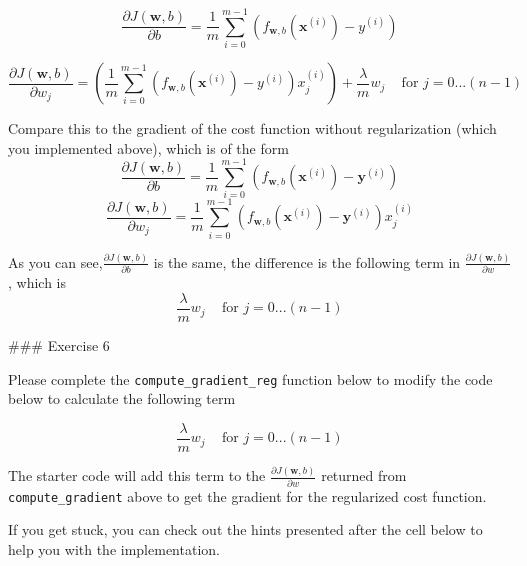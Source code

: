 \documentclass[11pt]{article}
\begin{document}
\[\frac{\partial J(\mathbf{w},b)}{\partial b} = \frac{1}{m}  \sum_{i=0}^{m-1} (f_{\mathbf{w},b}(\mathbf{x}^{(i)}) - y^{(i)})  \]

\[\frac{\partial J(\mathbf{w},b)}{\partial w_j} = \left( \frac{1}{m}  \sum_{i=0}^{m-1} (f_{\mathbf{w},b}(\mathbf{x}^{(i)}) - y^{(i)}) x_j^{(i)} \right) + \frac{\lambda}{m} w_j  \quad\, \mbox{for $j=0...(n-1)$}\]

Compare this to the gradient of the cost function without regularization
(which you implemented above), which is of the form \[
\frac{\partial J(\mathbf{w},b)}{\partial b}  = \frac{1}{m} \sum\limits_{i = 0}^{m-1} (f_{\mathbf{w},b}(\mathbf{x}^{(i)}) - \mathbf{y}^{(i)}) \tag{2}
\] \[
\frac{\partial J(\mathbf{w},b)}{\partial w_j}  = \frac{1}{m} \sum\limits_{i = 0}^{m-1} (f_{\mathbf{w},b}(\mathbf{x}^{(i)}) - \mathbf{y}^{(i)})x_{j}^{(i)} \tag{3}
\]

As you can see,\(\frac{\partial J(\mathbf{w},b)}{\partial b}\) is the
same, the difference is the following term in
\(\frac{\partial J(\mathbf{w},b)}{\partial w}\), which is
\[\frac{\lambda}{m} w_j  \quad\, \mbox{for $j=0...(n-1)$}\]

    \#\#\# Exercise 6

Please complete the \texttt{compute\_gradient\_reg} function below to
modify the code below to calculate the following term

\[\frac{\lambda}{m} w_j  \quad\, \mbox{for $j=0...(n-1)$}\]

The starter code will add this term to the
\(\frac{\partial J(\mathbf{w},b)}{\partial w}\) returned from
\texttt{compute\_gradient} above to get the gradient for the regularized
cost function.

If you get stuck, you can check out the hints presented after the cell
below to help you with the implementation.
\end{document}

